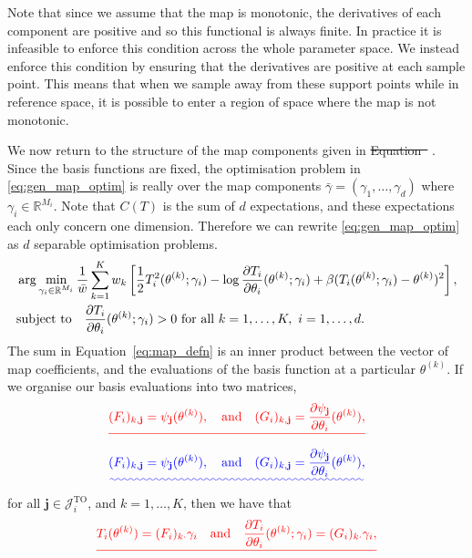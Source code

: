 \documentclass[final]{siamltex}
\providecommand{\DIFadd}[1]{{\protect\color{blue}\uwave{#1}}} %
\providecommand{\DIFdel}[1]{{\protect\color{red}\sout{#1}}}                      %
\providecommand{\DIFaddbegin}{} %
\providecommand{\DIFaddend}{} %
\providecommand{\DIFdelbegin}{} %
\providecommand{\DIFdelend}{} %
\newcommand{\DIFscaledelfig}{0.5}
\newlength{\DIFdelgraphicswidth} %
\newlength{\DIFdelgraphicsheight} %
\newcommand{\DIFaddincludegraphics}[2][]{{\color{blue}\fbox{\DIFOincludegraphics[#1]{#2}}}} %
\newcommand{\DIFdelincludegraphics}[2][]{%
\sbox{\DIFdelgraphicsbox}{\DIFOincludegraphics[#1]{#2}}%
\settoboxwidth{\DIFdelgraphicswidth}{\DIFdelgraphicsbox} %
\settoboxtotalheight{\DIFdelgraphicsheight}{\DIFdelgraphicsbox} %
\scalebox{\DIFscaledelfig}{%
\parbox[b]{\DIFdelgraphicswidth}{\usebox{\DIFdelgraphicsbox}\\[-\baselineskip] \rule{\DIFdelgraphicswidth}{0em}}\llap{\resizebox{\DIFdelgraphicswidth}{\DIFdelgraphicsheight}{%
\setlength{\unitlength}{\DIFdelgraphicswidth}%
\begin{picture}(1,1)%
\thicklines\linethickness{2pt} %
{\color[rgb]{1,0,0}\put(0,0){\framebox(1,1){}}}%
{\color[rgb]{1,0,0}\put(0,0){\line( 1,1){1}}}%
{\color[rgb]{1,0,0}\put(0,1){\line(1,-1){1}}}%
\end{picture}%
}\hspace*{3pt}}} %
} %
\DeclareRobustCommand{\DIFaddbegin}{\DIFOaddbegin \let\includegraphics\DIFaddincludegraphics} %
\DeclareRobustCommand{\DIFaddend}{\DIFOaddend \let\includegraphics\DIFOincludegraphics} %
\DeclareRobustCommand{\DIFdelbegin}{\DIFOdelbegin \let\includegraphics\DIFdelincludegraphics} %
\DeclareRobustCommand{\DIFdelend}{\DIFOaddend \let\includegraphics\DIFOincludegraphics} %
\begin{document}
Note that since we assume that the map is monotonic, the derivatives of each component are
positive and so this functional is always finite. In practice it is infeasible to enforce this condition across the whole parameter space. We instead enforce this condition by ensuring that the derivatives are positive at each sample point. This means that when we sample away from these support points while in reference space, it is possible to enter a region of space where the map is not monotonic.

We now return to the structure of the map components given in \DIFdelbegin \DIFdel{Equation~}%
\DIFdelend \DIFaddbegin \DIFadd{equation
\ref{eq:map_defn}}\DIFaddend . Since the basis functions are
fixed, the optimisation problem in \eqref{eq:gen_map_optim} is really over the map components $\bar{\gamma} = (\gamma_1, \dots,
\gamma_d)$ where $\gamma_i \in \mathbb{R}^{M_i}$. Note that $C(T)$ is the sum of $d$ expectations, and these expectations each only concern one dimension. Therefore we can rewrite \eqref{eq:gen_map_optim} as $d$ separable optimisation problems.
\begin{align}\label{eq:gamma_map_optim}
	&\arg\min_{\gamma_i\in\mathbb{R}^{M_i}} \frac{1}{\bar{w}}\sum\limits_{k=1}^K
		w_k \left[\frac{1}{2}T_i^2(\theta^{(k)}; \gamma_i) - \log\frac{\partial T_i}{\partial\theta_i}(\theta^{(k)}; \gamma_i) + \beta(T_i(\theta^{(k)};
		\gamma_i)-\theta^{(k)})^2\right], \\
	&\text{subject to} \quad \frac{\partial T_i}{\partial\theta_i}(\theta^{(k)};
		\gamma_i) > 0 \ \text{for all}\ k=1,\dots,K,\ i=1,\dots,d.
		\notag
\end{align}
The sum in Equation~\eqref{eq:map_defn} is an inner
product between the vector of map coefficients, and the evaluations of the basis function at a
particular $\theta^{(k)}$. If we organise our basis evaluations into two matrices,
\DIFdelbegin \[
	\DIFdel{(F_i)_{k,\mathbf{j}} = \psi_\mathbf{j}(\theta^{(k)}), \quad \text{and} \quad (G_i)_{k,\mathbf{j}} =
\frac{\partial\psi_\mathbf{j}}{\partial\theta_i}(\theta^{(k)}),
}\]
\DIFdelend \DIFaddbegin \begin{equation}
	\DIFadd{(F_i)_{k,\mathbf{j}} = \psi_\mathbf{j}(\theta^{(k)}), \quad \text{and} \quad (G_i)_{k,\mathbf{j}} =
\frac{\partial\psi_\mathbf{j}}{\partial\theta_i}(\theta^{(k)}),
}\end{equation}
\DIFaddend for all $\mathbf{j}
\in \mathcal{J}_i^\text{TO}$, and $k = 1,\dots,K$, then we have that
\DIFdelbegin \[
	\DIFdel{T_i(\theta^{(k)}) = (F_i)_{k\cdot}\gamma_i \quad \text{and} \quad \frac{\partial T_i}{\partial \theta_i}(\theta^{(k)}; \gamma_i) = (G_i)_{k\cdot}\gamma_i,
}\]
\end{document}
